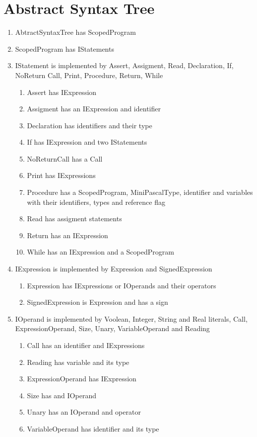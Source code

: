 \documentclass[english]{article}
\begin{document}
\section{Abstract Syntax Tree}
\begin{enumerate}
\item AbtractSyntaxTree has ScopedProgram
\item ScopedProgram has IStatements
\item IStatement is implemented by Assert, Assigment, Read, Declaration, If, NoReturn Call, Print, Procedure, Return, While
\begin{enumerate}
\item Assert has IExpression
\item Assigment has an IExpression and identifier
\item Declaration has identifiers and their type
\item If has IExpression and two IStatements
\item NoReturnCall has a Call
\item Print has IExpressions
\item Procedure has a ScopedProgram, MiniPascalType, identifier and variables with their identifiers, types and reference flag
\item Read has assigment statements
\item Return has an IExpression
\item While has an IExpression and a ScopedProgram
\end{enumerate}
\item IExpression is implemented by Expression and SignedExpression
\begin{enumerate}
\item Expression has IExpressions or IOperands and their operators
\item SignedExpression is Expression and has a sign
\end{enumerate}
\item IOperand is implemented by Voolean, Integer, String and Real literals, Call, ExpressionOperand, Size, Unary, VariableOperand and Reading
\begin{enumerate}
\item Call has an identifier and IExpressions
\item Reading has variable and its type
\item ExpressionOperand has IExpression
\item Size has and IOperand
\item Unary has an IOperand and operator
\item VariableOperand has identifier and its type
\end{enumerate}


\end{enumerate}





\end{document}
